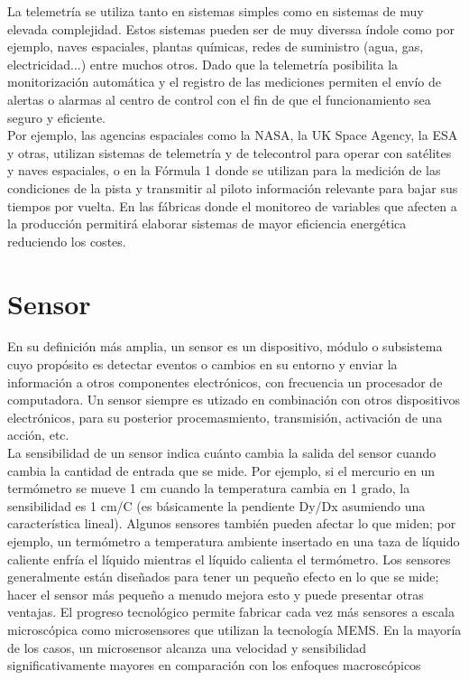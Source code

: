 La telemetría se utiliza tanto en sistemas simples como en sistemas de muy elevada complejidad. Estos sistemas pueden ser de muy diverssa índole como por ejemplo, naves espaciales,
plantas químicas, redes de suministro (agua, gas, electricidad...) entre muchos otros. Dado que la telemetría posibilita la monitorización automática y el registro de las mediciones
permiten el envío de alertas o alarmas al centro de control con el fin de que el funcionamiento sea seguro y eficiente.\\

Por ejemplo, las agencias espaciales como la NASA, la UK Space Agency, la ESA y otras, utilizan sistemas de telemetría y de telecontrol para operar con satélites y naves espaciales,
o en la Fórmula 1 donde se utilizan para la medición de las condiciones de la pista y transmitir al piloto información relevante para bajar sus tiempos por vuelta. En las fábricas donde
el monitoreo de variables que afecten a la producción permitirá elaborar sistemas de mayor eficiencia energética reduciendo los costes.\\

\section{Sensor}
\label{sec:sensor-definicion}

En su definición más amplia, un sensor es un dispositivo, módulo o subsistema cuyo propósito es detectar eventos o cambios en su entorno y enviar la información a otros
componentes electrónicos, con frecuencia un procesador de computadora. Un sensor siempre es utizado en combinación con otros dispositivos electrónicos, para su posterior 
procemasmiento, transmisión, activación de una acción, etc.\\

La sensibilidad de un sensor indica cuánto cambia la salida del sensor cuando cambia la cantidad de entrada que se mide. Por ejemplo, si el mercurio en un termómetro se mueve
1 cm cuando la temperatura cambia en 1 grado, la sensibilidad es 1 cm/C (es básicamente la pendiente Dy/Dx asumiendo una característica lineal). Algunos sensores también pueden
afectar lo que miden; por ejemplo, un termómetro a temperatura ambiente insertado en una taza de líquido caliente enfría el líquido mientras el líquido calienta el termómetro.
Los sensores generalmente están diseñados para tener un pequeño efecto en lo que se mide; hacer el sensor más pequeño a menudo mejora esto y puede presentar otras ventajas. 
El progreso tecnológico permite fabricar cada vez más sensores a escala microscópica como microsensores que utilizan la tecnología MEMS. En la mayoría de los casos, un microsensor 
alcanza una velocidad y sensibilidad significativamente mayores en comparación con los enfoques macroscópicos

